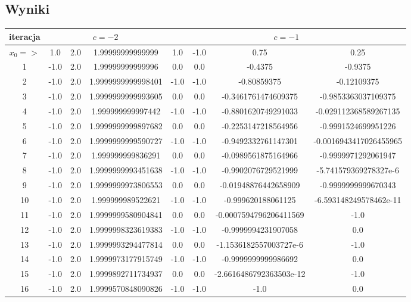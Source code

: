 \documentclass[]{article}
\begin{document}
\subsection{Wyniki}
\begin{table}[h!]
	\centering
	\begin{tabular}{||c c c c c c c c||} 
		\hline
		iteracja \vline & \multicolumn{3}{c}{$c = -2$} \vline & \multicolumn{4}{c||}{$c = -1$}  \\ [0.25ex]
		\hline		 
		$x_0 =>$ & 1.0 & 2.0 & 1.99999999999999 & 1.0 & -1.0 & 0.75 & 0.25 \\
		\hline\hline
		1 & -1.0 & 2.0 & 1.99999999999996 & 0.0 & 0.0 & -0.4375 & -0.9375 \\
		2 & -1.0 & 2.0 & 1.9999999999998401 & -1.0 & -1.0 & -0.80859375 & -0.12109375 \\
		3 & -1.0 & 2.0 & 1.9999999999993605 & 0.0 & 0.0 & -0.3461761474609375 & -0.9853363037109375 \\
		4 & -1.0 & 2.0 & 1.999999999997442 & -1.0 & -1.0 & -0.8801620749291033 & -0.029112368589267135 \\
		5 & -1.0 & 2.0 & 1.9999999999897682 & 0.0 & 0.0 & -0.2253147218564956 & -0.9991524699951226 \\
		6 & -1.0 & 2.0 & 1.9999999999590727 & -1.0 & -1.0 & -0.9492332761147301 & -0.0016943417026455965\\
		7 & -1.0 & 2.0 & 1.999999999836291 & 0.0 & 0.0 & -0.0989561875164966 & -0.9999971292061947 \\
		8 & -1.0 & 2.0 & 1.9999999993451638 & -1.0 & -1.0 & -0.9902076729521999 & -5.741579369278327e-6 \\
		9 & -1.0 & 2.0 & 1.9999999973806553 & 0.0 & 0.0 & -0.01948876442658909 & -0.9999999999670343 \\
		10 & -1.0 & 2.0 & 1.999999989522621 & -1.0 & -1.0 & -0.999620188061125 & -6.593148249578462e-11 \\
		11 & -1.0 & 2.0 & 1.9999999580904841 & 0.0 & 0.0 & -0.0007594796206411569 & -1.0 \\
		12 & -1.0 & 2.0 & 1.9999998323619383 & -1.0 & -1.0 & -0.9999994231907058 & 0.0 \\
		13 & -1.0 & 2.0 & 1.9999993294477814 & 0.0 & 0.0 & -1.1536182557003727e-6 & -1.0 \\
		14 & -1.0 & 2.0 & 1.9999973177915749 & -1.0 & -1.0 & -0.9999999999986692 & 0.0 \\
		15 & -1.0 & 2.0 & 1.9999892711734937 & 0.0 & 0.0 & -2.6616486792363503e-12 & -1.0 \\
		16 & -1.0 & 2.0 & 1.9999570848090826 & -1.0 & -1.0 & -1.0 & 0.0 \\

\end{tabular}
\end{table}
\end{document}
